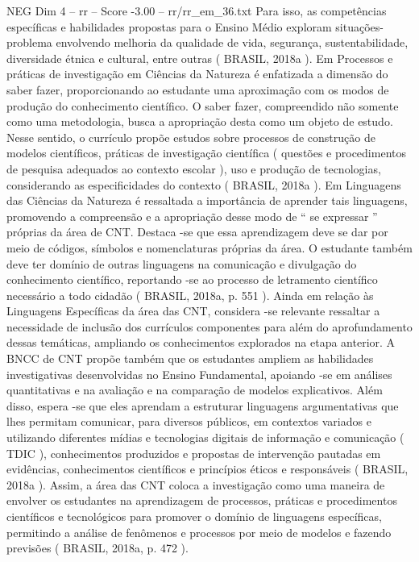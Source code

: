 \begin{textsample}{NEG Dim 4 – rr – Score -3.00 – rr/rr\_em\_36.txt}
Para isso, as competências específicas e habilidades propostas para o Ensino Médio exploram situações-problema envolvendo melhoria da qualidade de vida, segurança, sustentabilidade, diversidade étnica e cultural, entre outras ( BRASIL, 2018a ).
Em Processos e práticas de investigação em Ciências da Natureza é enfatizada a dimensão do saber fazer, proporcionando ao estudante uma aproximação com os modos de produção do conhecimento científico.
O saber fazer, compreendido não somente como uma metodologia, busca a apropriação desta como um objeto de estudo.
Nesse sentido, o currículo propõe estudos sobre processos de construção de modelos científicos, práticas de investigação científica ( questões e procedimentos de pesquisa adequados ao contexto escolar ), uso e produção de tecnologias, considerando as especificidades do contexto ( BRASIL, 2018a ).
Em Linguagens das Ciências da Natureza é ressaltada a importância de aprender tais linguagens, promovendo a compreensão e a apropriação desse modo de “ se expressar ” próprias da área de CNT.
Destaca -se que essa aprendizagem deve se dar por meio de códigos, símbolos e nomenclaturas próprias da área.
O estudante também deve ter domínio de outras linguagens na comunicação e divulgação do conhecimento científico, reportando -se ao processo de letramento científico necessário a todo cidadão ( BRASIL, 2018a, p. 551 ).
Ainda em relação às Linguagens Específicas da área das CNT, considera -se relevante ressaltar a necessidade de inclusão dos currículos componentes para além do aprofundamento dessas temáticas, ampliando os conhecimentos explorados na etapa anterior.
A BNCC de CNT propõe também que os estudantes ampliem as habilidades investigativas desenvolvidas no Ensino Fundamental, apoiando -se em análises quantitativas e na avaliação e na comparação de modelos explicativos.
Além disso, espera -se que eles aprendam a estruturar linguagens argumentativas que lhes permitam comunicar, para diversos públicos, em contextos variados e utilizando diferentes mídias e tecnologias digitais de informação e comunicação ( TDIC ), conhecimentos produzidos e propostas de intervenção pautadas em evidências, conhecimentos científicos e princípios éticos e responsáveis ( BRASIL, 2018a ).
Assim, a área das CNT coloca a investigação como uma maneira de envolver os estudantes na aprendizagem de processos, práticas e procedimentos científicos e tecnológicos para promover o domínio de linguagens específicas, permitindo a análise de fenômenos e processos por meio de modelos e fazendo previsões ( BRASIL, 2018a, p. 472 ).

\end{textsample}
